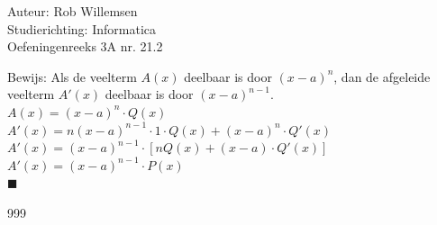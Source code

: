 \documentclass[a4paper]{article}
\begin{document}
\noindent \large Auteur: Rob Willemsen \\
\noindent \large Studierichting: Informatica\\
\noindent \large Oefeningenreeks 3A nr. 21.2\\

\medskip

\normalsize

Bewijs: Als de veelterm $A(x)$ deelbaar is door $(x-a)^n$, dan de afgeleide veelterm $A'(x)$ deelbaar is door $(x-a)^{n-1}$. \\

$A(x) = (x-a)^n \cdot Q(x)$ \\

$A'(x) = n(x-a)^{n-1} \cdot 1 \cdot Q(x) + (x-a)^n \cdot Q'(x)$ \\

$A'(x) = (x-a)^{n-1} \cdot \left[nQ(x) + (x-a) \cdot Q'(x)\right]$ \\

$A'(x) = (x-a)^{n-1} \cdot P(x)$ \\

$\blacksquare$ \\

\begin{thebibliography}{999}
\end{thebibliography}
\end{document}
